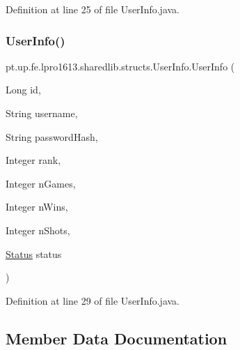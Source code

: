 Definition at line 25 of file User\+Info.\+java.

\hypertarget{classpt_1_1up_1_1fe_1_1lpro1613_1_1sharedlib_1_1structs_1_1_user_info_a1a787cf68194036f7ef146eb1b7745d2}{}\label{classpt_1_1up_1_1fe_1_1lpro1613_1_1sharedlib_1_1structs_1_1_user_info_a1a787cf68194036f7ef146eb1b7745d2} 
\subsubsection{\texorpdfstring{User\+Info()}{UserInfo()}\hspace{0.1cm}{\footnotesize\ttfamily [3/3]}}
{\footnotesize\ttfamily pt.\+up.\+fe.\+lpro1613.\+sharedlib.\+structs.\+User\+Info.\+User\+Info (\begin{DoxyParamCaption}\item[{Long}]{id,  }\item[{String}]{username,  }\item[{String}]{password\+Hash,  }\item[{Integer}]{rank,  }\item[{Integer}]{n\+Games,  }\item[{Integer}]{n\+Wins,  }\item[{Integer}]{n\+Shots,  }\item[{\hyperlink{enumpt_1_1up_1_1fe_1_1lpro1613_1_1sharedlib_1_1structs_1_1_user_info_1_1_status}{Status}}]{status }\end{DoxyParamCaption})}



Definition at line 29 of file User\+Info.\+java.



\subsection{Member Data Documentation}
\hypertarget{classpt_1_1up_1_1fe_1_1lpro1613_1_1sharedlib_1_1structs_1_1_user_info_a2f93648cc465eb07aaa104c7490c5bf1}{}\label{classpt_1_1up_1_1fe_1_1lpro1613_1_1sharedlib_1_1structs_1_1_user_info_a2f93648cc465eb07aaa104c7490c5bf1} 
